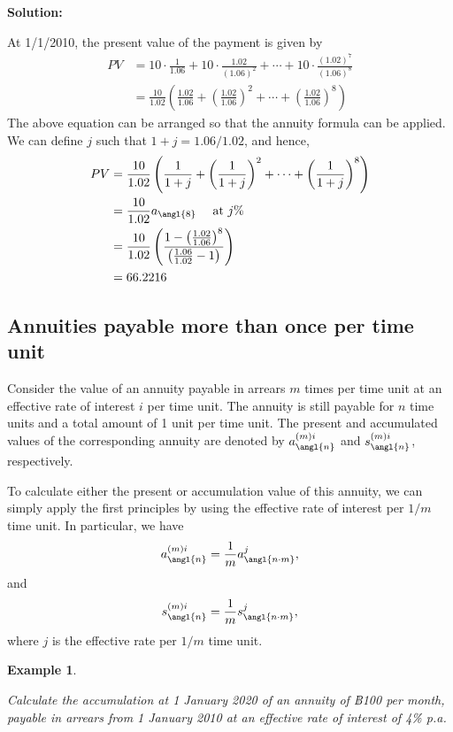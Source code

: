 \documentclass[
]{book}
\theoremstyle{definition}
\theoremstyle{definition}
\newtheorem{example}{Example}[chapter]
\theoremstyle{definition}
\theoremstyle{definition}
\theoremstyle{remark}
\begin{document}
\textbf{Solution:}

At 1/1/2010, the present value of the payment is given by
\[\begin{aligned}
    PV &= 10 \cdot \frac{1}{1.06} + 10 \cdot \frac{1.02}{(1.06)^2} + \cdots +  10 \cdot \frac{(1.02)^7}{(1.06)^8} \\
        &= \frac{10}{1.02} \left(  \frac{1.02}{1.06} +  \left(  \frac{1.02}{1.06}  \right)^2 + \cdots +
    \left(  \frac{1.02}{1.06}  \right)^8  \right)\end{aligned}\] The
above equation can be arranged so that the annuity formula can be
applied. We can define \(j\) such that \(1 + j = 1.06/1.02\), and hence,
\[\begin{aligned}
    PV &= \frac{10}{1.02} \left(  \frac{1}{1 + j} +  \left(  \frac{1}{1+j}  \right)^2 + \cdots +
    \left(  \frac{1}{1+j}  \right)^8  \right)  \\
    &=   \frac{10}{1.02}  a_\angl{8} \quad  \text{ at } j\% \\
    &=  \frac{10}{1.02} \left(   \frac{1 - \left(\frac{1.02}{1.06}\right)^8   }{\left(   \frac{1.06}{1.02}   - 1 \right)}  \right) \\
    &= 66.2216\end{aligned}\]

\hypertarget{annuities-payable-more-than-once-per-time-unit}{%
\subsection{Annuities payable more than once per time unit}\label{annuities-payable-more-than-once-per-time-unit}}

Consider the value of an annuity payable in arrears \(m\) times per time
unit at an effective rate of interest \(i\) per time unit. The annuity is
still payable for \(n\) time units and a total amount of 1 unit per time
unit. The present and accumulated values of the corresponding annuity
are denoted by \(a^{(m)i}_\angl{n}\) and \(s^{(m)i}_\angl{n}\),
respectively.

To calculate either the present or accumulation value of this annuity,
we can simply apply the first principles by using the effective rate of
interest per \(1/m\) time unit. In particular, we have
\[a^{(m)i}_\angl{n}   = \frac{1}{m}  a^j_\angl{n\cdot m},\] and
\[s^{(m)i}_\angl{n}   = \frac{1}{m}  s^j_\angl{n\cdot m},\] where \(j\) is
the effective rate per \(1/m\) time unit.

\begin{example}
\protect\hypertarget{exm:unlabeled-div-37}{}\label{exm:unlabeled-div-37}

\emph{Calculate the accumulation at 1 January 2020 of an annuity of ฿100 per
month, payable in arrears from 1 January 2010 at an effective rate of
interest of 4\% p.a.}

\end{example}
\end{document}
